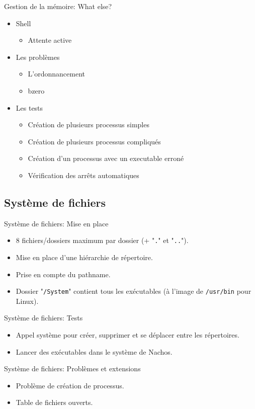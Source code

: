\documentclass{beamer}
\begin{document}
\begin{frame}{Gestion de la mémoire: What else?}
    \begin{itemize}
        \item Shell
        \begin{itemize}
 			\item Attente active
 		\end{itemize}
        \item Les problèmes
        \begin{itemize}
 		\item L'ordonnancement
 		\item bzero
  		\end{itemize}
        \item Les tests
        \begin{itemize}
 		\item Création de plusieurs processus simples
 		\item Création de plusieurs processus compliqués
 		\item Création d'un processus avec un executable erroné
 		\item Vérification des arrêts automatiques
  		\end{itemize}
    \end{itemize}
\end{frame}

\subsection{Système de fichiers}

\begin{frame}{Système de fichiers: Mise en place }
    \begin{itemize}
		\item 8 fichiers/dossiers maximum par dossier (+ "\texttt{.}" et "\texttt{..}").
		\item Mise en place d'une hiérarchie de répertoire.
		\item Prise en compte du pathname.
		\item Dossier "\texttt{/System}" contient tous les exécutables (à l'image de \texttt{/usr/bin} pour Linux).
    \end{itemize}
\end{frame}
\begin{frame}{Système de fichiers: Tests }
    \begin{itemize}
		\item Appel système pour créer, supprimer et se déplacer entre les répertoires.
		\item Lancer des exécutables dans le système de Nachos.
		
    \end{itemize}
\end{frame}
\begin{frame}{Système de fichiers: Problèmes et extensions }
    \begin{itemize}
		\item Problème de création de processus. 
		\item Table de fichiers ouverts.
		
    \end{itemize}
\end{frame}
\end{document}
